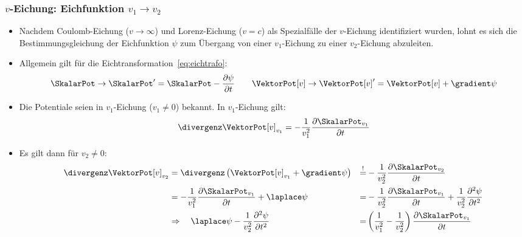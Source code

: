 \begin{frame}
  \frametitle{$v$-Eichung: Eichfunktion $v_1 \to v_2$}
  \begin{itemize}[<+->]
  \item Nachdem Coulomb-Eichung ($v\to\infty$) und Lorenz-Eichung ($v=c$) als Spezialfälle der $v$-Eichung identifiziert wurden, lohnt es sich die Bestimmungsgleichung der Eichfunktion $\psi$ zum Übergang von einer $v_1$-Eichung zu einer $v_2$-Eichung abzuleiten.
  \item Allgemein gilt für die Eichtransformation~\eqref{eq:eichtrafo}:
    \begin{equation*}
            \SkalarPot \to \SkalarPot^\prime = \SkalarPot - \frac{\partial \psi}{\partial t} \quad\quad \VektorPot[v] \to \VektorPot[v]^\prime = \VektorPot[v] + \gradient\psi 
      \end{equation*}
  \item Die Potentiale seien in $v_1$-Eichung ($v_1 \neq 0$) bekannt. In $v_1$-Eichung gilt:
    \begin{equation}
      \divergenz \VektorPot[v]_{v_1} = -\frac{1}{v_1^2} \frac{\partial \SkalarPot _{v_1}}{\partial t} 
    \end{equation}
  \item Es gilt dann für $v_2 \neq 0$:
    \begin{equation}
      \begin{aligned}
        \divergenz \VektorPot[v]_{v_2} &= \divergenz \left( \VektorPot[v]_{v_1} + \gradient\psi\right) &\stackrel{!}{=}& -\frac{1}{v_2^2} \frac{\partial \SkalarPot _{v_2}}{\partial t} \\
        &= -\frac{1}{v_1^2} \frac{\partial \SkalarPot _{v_1}}{\partial t} + \laplace \psi &=& -\frac{1}{v_2^2} \frac{\partial \SkalarPot _{v_1}}{\partial t} +\frac{1}{v_2^2} \frac{\partial^2 \psi}{\partial t^2}\\
      & \Rightarrow\quad \laplace \psi -\frac{1}{v_2^2} \frac{\partial^2 \psi}{\partial t^2} &=& \left(\frac{1}{v_1^2}  -\frac{1}{v_2^2} \right) \frac{\partial \SkalarPot _{v_1}}{\partial t}
        \end{aligned}
      \end{equation}
  \end{itemize}
\end{frame}



